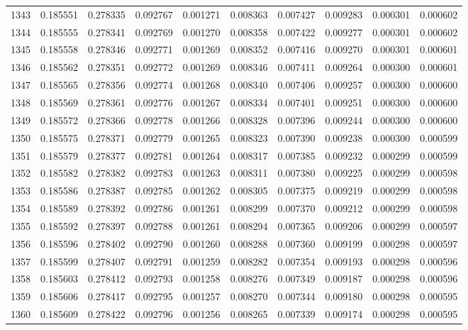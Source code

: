 \begin{tabular}{lrrrrrrrrr}
1343 & 0.185551 & 0.278335 & 0.092767 & 0.001271 & 0.008363 & 0.007427 & 0.009283 & 0.000301 & 0.000602 \\
1344 & 0.185555 & 0.278341 & 0.092769 & 0.001270 & 0.008358 & 0.007422 & 0.009277 & 0.000301 & 0.000602 \\
1345 & 0.185558 & 0.278346 & 0.092771 & 0.001269 & 0.008352 & 0.007416 & 0.009270 & 0.000301 & 0.000601 \\
1346 & 0.185562 & 0.278351 & 0.092772 & 0.001269 & 0.008346 & 0.007411 & 0.009264 & 0.000300 & 0.000601 \\
1347 & 0.185565 & 0.278356 & 0.092774 & 0.001268 & 0.008340 & 0.007406 & 0.009257 & 0.000300 & 0.000600 \\
1348 & 0.185569 & 0.278361 & 0.092776 & 0.001267 & 0.008334 & 0.007401 & 0.009251 & 0.000300 & 0.000600 \\
1349 & 0.185572 & 0.278366 & 0.092778 & 0.001266 & 0.008328 & 0.007396 & 0.009244 & 0.000300 & 0.000600 \\
1350 & 0.185575 & 0.278371 & 0.092779 & 0.001265 & 0.008323 & 0.007390 & 0.009238 & 0.000300 & 0.000599 \\
1351 & 0.185579 & 0.278377 & 0.092781 & 0.001264 & 0.008317 & 0.007385 & 0.009232 & 0.000299 & 0.000599 \\
1352 & 0.185582 & 0.278382 & 0.092783 & 0.001263 & 0.008311 & 0.007380 & 0.009225 & 0.000299 & 0.000598 \\
1353 & 0.185586 & 0.278387 & 0.092785 & 0.001262 & 0.008305 & 0.007375 & 0.009219 & 0.000299 & 0.000598 \\
1354 & 0.185589 & 0.278392 & 0.092786 & 0.001261 & 0.008299 & 0.007370 & 0.009212 & 0.000299 & 0.000598 \\
1355 & 0.185592 & 0.278397 & 0.092788 & 0.001261 & 0.008294 & 0.007365 & 0.009206 & 0.000299 & 0.000597 \\
1356 & 0.185596 & 0.278402 & 0.092790 & 0.001260 & 0.008288 & 0.007360 & 0.009199 & 0.000298 & 0.000597 \\
1357 & 0.185599 & 0.278407 & 0.092791 & 0.001259 & 0.008282 & 0.007354 & 0.009193 & 0.000298 & 0.000596 \\
1358 & 0.185603 & 0.278412 & 0.092793 & 0.001258 & 0.008276 & 0.007349 & 0.009187 & 0.000298 & 0.000596 \\
1359 & 0.185606 & 0.278417 & 0.092795 & 0.001257 & 0.008270 & 0.007344 & 0.009180 & 0.000298 & 0.000595 \\
1360 & 0.185609 & 0.278422 & 0.092796 & 0.001256 & 0.008265 & 0.007339 & 0.009174 & 0.000298 & 0.000595 \\

\end{tabular}
